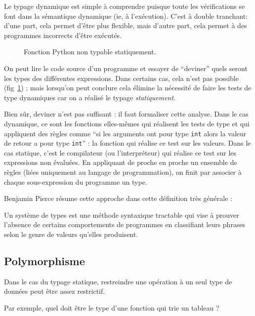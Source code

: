 Le typage dynamique est simple à comprendre puisque toute les vérifications se
font dans la sémantique dynamique (ie, à l'exécution). C'est à double tranchant:
d'une part, cela permet d'être plus flexible, mais d'autre part, cela permet à
des programmes incorrects d'être exécutés.

\begin{figure}
  \caption{Fonction Python non typable statiquement.}
  \label{fig:nontypable}
\end{figure}

On peut lire le code source d'un programme et essayer de ``deviner'' quels
seront les types des différentes expressions. Dans certains cas, cela n'est pas
possible (fig~\ref{fig:nontypable}) ; mais lorsqu'on peut conclure cela élimine
la nécessité de faire les tests de type dynamiques car on a réalisé le typage
\emph{statiquement}.

Bien sûr, deviner n'est pas suffisant : il faut formaliser cette analyse. Dans
le cas dynamique, ce sont les fonctions elles-mêmes qui réalisent les tests de
type et qui appliquent des règles comme ``si les arguments ont pour type
\texttt{int} alors la valeur de retour a pour type \texttt{int}'' : la
fonction qui réalise ce test sur les valeurs. Dans le cas statique,
c'est le compilateur (ou l'interpréteur) qui réalise ce test sur les
expressions non évaluées. En
appliquant de proche en proche un ensemble de règles (liées uniquement au
langage de programmation), on finit par associer à chaque sous-expression du
programme un type.

Benjamin Pierce résume cette approche dans cette définition très générale :

\begin{definition}
Un système de types est une méthode syntaxique tractable qui vise à prouver
l'absence de certains comportements de programmes en classifiant leurs phrases
selon le genre de valeurs qu'elles produisent. \cite{TAPL}
\end{definition}

\subsection{Polymorphisme}

Dans le cas du typage statique, restreindre une opération à un seul type de
données peut être assez restrictif.

Par exemple, quel doit être le type d'une fonction qui trie un tableau ?

